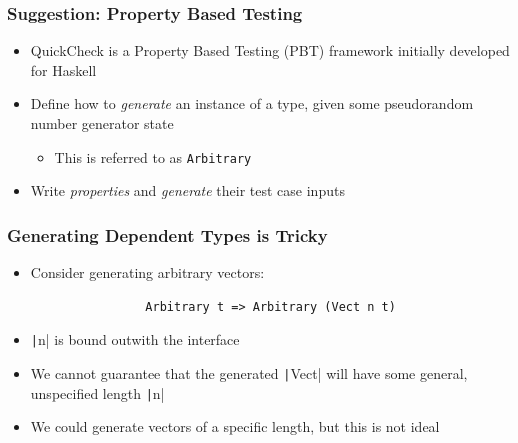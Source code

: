\documentclass[compress,handout]{beamer}
\begin{document}
\begin{frame}
  \frametitle{Suggestion: Property Based Testing}

  \begin{itemize}
    \item<1-> QuickCheck is a Property Based Testing (PBT) framework initially
              developed for Haskell
    \item<2-> Define how to \emph{generate} an instance of a type, given some
              pseudorandom number generator state
      \begin{itemize}
        \item<2-> This is referred to as \texttt{Arbitrary}
      \end{itemize}
    \item<3-> Write \emph{properties} and \emph{generate} their test case inputs
  \end{itemize}

\end{frame}


\begin{frame}[fragile]
  \frametitle{Generating Dependent Types is Tricky}

  \begin{itemize}
    \item<1-> Consider generating arbitrary vectors:
              \begin{verbatim}
                Arbitrary t => Arbitrary (Vect n t)
              \end{verbatim}
    \item<2-> \texttt|n| is bound outwith the interface
    \item<3-> We cannot guarantee that the generated \texttt|Vect|
              will have some general, unspecified length \texttt|n|
    \item<4-> We could generate vectors of a specific length, but this is not
              ideal
  \end{itemize}

\end{frame}
\end{document}
